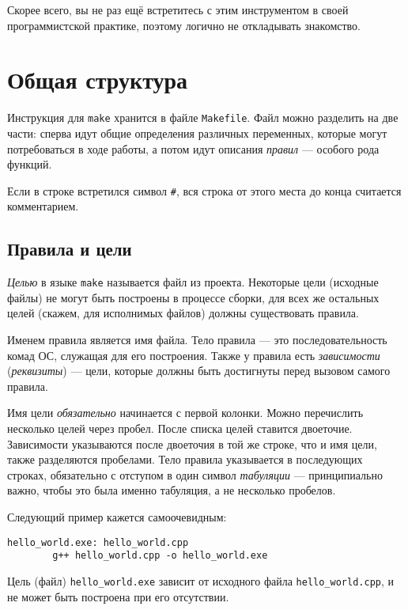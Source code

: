\documentclass[11pt,a4paper,oneside]{article}
\begin{document}
Скорее всего, вы не раз ещё встретитесь с этим инструментом в своей программистской 
практике, поэтому логично не откладывать знакомство.

\section*{Общая структура}

Инструкция для \texttt{make} хранится в файле \texttt{Makefile}. Файл
можно разделить на две части: сперва идут общие определения различных переменных,
которые могут потребоваться в ходе работы, а потом идут описания \emph{правил} ---
особого рода функций.

Если в строке встретился символ \verb!#!, вся строка от этого места до конца
считается комментарием.

\subsection*{Правила и цели}

\emph{Целью} в языке \texttt{make} называется файл из проекта. Некоторые цели
(исходные файлы) не могут быть построены в процессе сборки, для всех же остальных
целей (скажем, для исполнимых файлов) должны существовать правила.

Именем правила является имя файла. Тело правила --- это последовательность
комад ОС, служащая для его построения. Также у правила есть \emph{зависимости} 
(\emph{реквизиты}) --- цели, которые должны быть достигнуты перед вызовом самого
правила. 

Имя цели \emph{обязательно} начинается с первой колонки. Можно перечислить несколько
целей через пробел. После списка целей ставится двоеточие.
Зависимости указываются после двоеточия в той же строке, что и имя цели, также разделяются
пробелами. Тело правила указывается в последующих строках, обязательно с отступом в один
символ \emph{табуляции} --- принципиально важно, чтобы это была именно табуляция, 
а не несколько пробелов.

Следующий пример кажется самоочевидным:
\begin{verbatim}
hello_world.exe: hello_world.cpp
        g++ hello_world.cpp -o hello_world.exe
\end{verbatim}

Цель (файл) \verb!hello_world.exe! зависит от исходного файла \verb!hello_world.cpp!,
и не может быть построена при его отсутствии.
\end{document}
